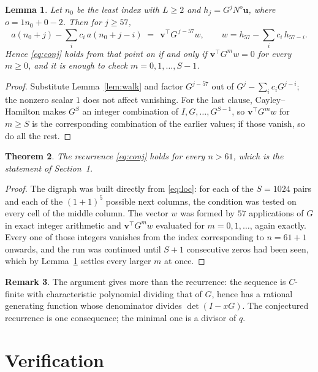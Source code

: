 \documentclass[11pt,a4paper]{article}
\theoremstyle{plain}
\newtheorem{theorem}{Theorem}
\newtheorem{lemma}[theorem]{Lemma}
\theoremstyle{definition}
\newtheorem{remark}[theorem]{Remark}
\begin{document}
\begin{lemma}\label{lem:crit}
Let $n_0$ be the least index with $L\ge2$ and $h_j=G^{j}N^{o}\mathbf{u}$, where
$o=1n_0+0-2$. Then for $j\ge57$,
\[
a(n_0+j)-\sum_i c_i\,a(n_0+j-i)\;=\;\,\mathbf{v}^{\!\top}G^{\,j-57}w,
\qquad w=h_{57}-\sum_i c_i\,h_{57-i} .
\]
Hence \eqref{eq:conj} holds from that point on if and only if
$\mathbf{v}^{\!\top}G^{m}w=0$ for every $m\ge0$, and it is enough to check
$m=0,1,\dots,S-1$.
\end{lemma}

\begin{proof}
Substitute Lemma~\ref{lem:walk} and factor $G^{j-57}$ out of
$G^{j}-\sum_ic_iG^{j-i}$; the nonzero scalar $1$ does not affect
vanishing. For the last clause, Cayley--Hamilton makes $G^{S}$ an integer combination of
$I,G,\dots,G^{S-1}$, so $\mathbf{v}^{\!\top}G^{m}w$ for $m\ge S$ is the corresponding
combination of the earlier values; if those vanish, so do all the rest.
\end{proof}

\begin{theorem}
The recurrence \eqref{eq:conj} holds for every $n>61$, which is the statement of
Section~1.
\end{theorem}

\begin{proof}
The digraph was built directly from \eqref{eq:loc}: for each of the $S=1024$ pairs and each
of the $(1+1)^{5}$ possible next columns, the condition was tested on every cell of
the middle column. The vector $w$ was formed by $57$ applications of $G$ in exact integer
arithmetic and $\mathbf{v}^{\!\top}G^{m}w$ evaluated for $m=0,1,\dots$, again exactly.
Every one of those integers vanishes from the index corresponding to $n=61+1$ onwards,
and the run was continued until $S+1$ consecutive zeros had been seen, which by
Lemma~\ref{lem:crit} settles every larger $m$ at once.
\end{proof}

\begin{remark}
The argument gives more than the recurrence: the sequence is $C$-finite with characteristic
polynomial dividing that of $G$, hence has a rational generating function whose denominator
divides $\det(I-xG)$. The conjectured recurrence is one consequence; the minimal one is a
divisor of $q$.
\end{remark}

\section{Verification}
\end{document}
